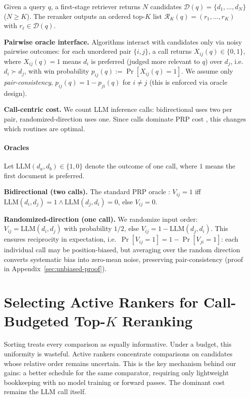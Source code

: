 \documentclass{llmxive}
\begin{document}
Given a query $q$, a first-stage retriever returns $N$ candidates
$\mathcal{D}(q)=\{d_1,\dots,d_N\}$ ($N\ge K$). The reranker outputs an ordered
top-$K$ list $\mathcal{R}_K(q)=(r_1,\dots,r_K)$ with $r_\ell \in \mathcal{D}(q)$.

\noindent\textbf{Pairwise oracle interface.}
Algorithms interact with candidates only via noisy pairwise outcomes: for each unordered pair $\{i,j\}$, a call returns $X_{ij}(q)\in\{0,1\}$, where $X_{ij}(q)=1$ means $d_i$ is preferred (judged more relevant to $q$) over $d_j$, i.e.\ $d_i \succ d_j$, with win probability $p_{ij}(q):=\Pr[X_{ij}(q)=1]$.
We assume only \emph{pair-consistency}, $p_{ij}(q)=1-p_{ji}(q)$ for $i\neq j$ (this is enforced via oracle design).

\noindent\textbf{Call-centric cost.}
We count LLM inference calls: bidirectional uses two per pair, randomized-direction uses one. Since calls dominate PRP cost \citep{wisznia2025batchingcaching}, this changes which routines are optimal.

\vspace{-0.2cm}
\paragraph{Oracles} Let $\text{LLM}(d_a, d_b) \in \{1, 0\}$ denote the outcome of one call, where $1$ means the first document is preferred.

\noindent\textbf{Bidirectional (two calls).}
The standard PRP oracle \citep{qin2024pairwise}: $V_{ij}=1$ iff $\text{LLM}(d_i,d_j)=1 \wedge \text{LLM}(d_j,d_i)=0$, else $V_{ij}=0$.

\noindent\textbf{Randomized-direction (one call).}
We randomize input order: $V_{ij}=\text{LLM}(d_i,d_j)$ with probability $1/2$, else $V_{ij}=1-\text{LLM}(d_j,d_i)$. This ensures reciprocity in expectation, i.e.\ $\Pr[V_{ij}{=}1] = 1 - \Pr[V_{ji}{=}1]$: each individual call may be position-biased, but averaging over the random direction converts systematic bias into zero-mean noise, preserving pair-consistency (proof in Appendix~\ref{sec:unbiased-proof}).

\section{Selecting Active Rankers for Call-Budgeted Top-\texorpdfstring{$K$}{K} Reranking}
\label{sec:select_active_rankers}

Sorting treats every comparison as equally informative. Under a budget, this uniformity is wasteful. Active rankers concentrate comparisons on candidates whose relative order remains uncertain. This is the key mechanism behind our gains: a better schedule for the same comparator, requiring only lightweight bookkeeping with no model training or forward passes. The dominant cost remains the LLM call itself.
\end{document}
